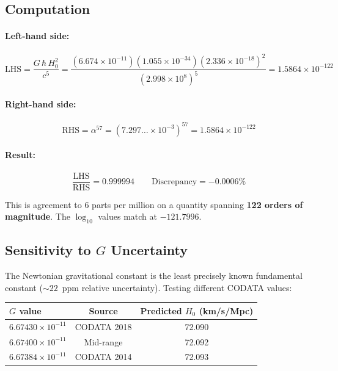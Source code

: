 \documentclass[11pt]{article}
\begin{document}
\subsection{Computation}

\paragraph{Left-hand side:}
\begin{equation}
\text{LHS} = \frac{G\,\hbar\,H_0^2}{c^5}
= \frac{(6.674 \times 10^{-11})(1.055 \times 10^{-34})(2.336 \times 10^{-18})^2}
       {(2.998 \times 10^8)^5}
= 1.5864 \times 10^{-122}
\end{equation}

\paragraph{Right-hand side:}
\begin{equation}
\text{RHS} = \alpha^{57} = (7.297\ldots \times 10^{-3})^{57}
= 1.5864 \times 10^{-122}
\end{equation}

\paragraph{Result:}
\begin{equation}
\boxed{\;\frac{\text{LHS}}{\text{RHS}} = 0.999994 \qquad
\text{Discrepancy} = -0.0006\%\;}
\end{equation}

This is agreement to 6 parts per million on a quantity spanning
\textbf{122 orders of magnitude}. The $\log_{10}$ values match at $-121.7996$.

\subsection{Sensitivity to $G$ Uncertainty}

The Newtonian gravitational constant is the least precisely known fundamental
constant ($\sim 22$~ppm relative uncertainty). Testing different CODATA values:

\begin{center}
\begin{tabular}{lcc}
\toprule
$G$ value & Source & Predicted $H_0$ (km/s/Mpc) \\
\midrule
$6.67430 \times 10^{-11}$ & CODATA 2018 & 72.090 \\
$6.67400 \times 10^{-11}$ & Mid-range & 72.092 \\
$6.67384 \times 10^{-11}$ & CODATA 2014 & 72.093 \\
\bottomrule
\end{tabular}
\end{center}
\end{document}
